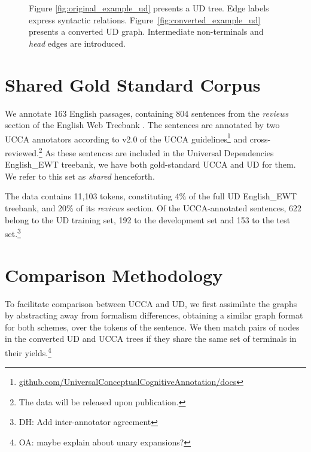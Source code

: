 \documentclass[11pt,a4paper]{article}
\newcommand{\oa}[1]{\footnote{\color{red}OA: #1}}
\newcommand{\daniel}[1]{\footnote{\color{blue}DH: #1}}
\begin{document}
\begin{figure}[!ht]
\caption{Figure \ref{fig:original_example_ud} presents a UD tree.
  Edge labels express syntactic relations.
Figure~\ref{fig:converted_example_ud} presents a converted UD graph.
Intermediate non-terminals and \textit{head} edges are introduced.
}\label{fig:ud_examples}
\end{figure}


\section{Shared Gold Standard Corpus}\label{sec:shared}

We annotate 163 English passages, containing 804 sentences
from the \textit{reviews} section of the 
English Web Treebank \cite[EWT; ][]{bies2012english}.
The sentences are annotated by two UCCA annotators
according to v2.0 of the UCCA
guidelines\footnote{{\scriptsize \url{github.com/UniversalConceptualCognitiveAnnotation/docs}}}
and cross-reviewed.\footnote{The data will be released upon publication.}
As these sentences are included in the Universal Dependencies 
English\_EWT treebank, we have both gold-standard UCCA and UD for them. 
We refer to this set as \textit{shared} henceforth.

The data contains 11,103 tokens, constituting 4\% of the full UD English\_EWT treebank,
and 20\% of its \textit{reviews} section.
Of the UCCA-annotated sentences, 622 belong to the UD training set,
192 to the development set and 153 to the test set.\daniel{Add inter-annotator agreement}


\section{Comparison Methodology}\label{sec:methodology}

To facilitate comparison between UCCA and UD,
we first assimilate the graphs by abstracting away from formalism differences,
obtaining a similar graph format for both schemes,
over the tokens of the sentence.
We then match pairs of nodes in the converted UD and UCCA trees
if they share the same set of terminals in their yields.\oa{maybe explain about unary expansions?} %
\end{document}
